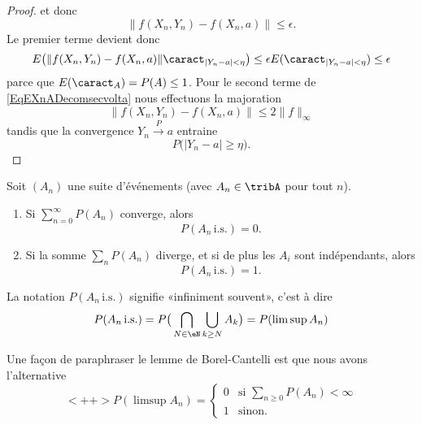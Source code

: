 \begin{proof}
    et donc
    \begin{equation}
        \| f(X_n,Y_n)-f(X_n,a) \|\leq \epsilon.
    \end{equation}
    Le premier terme devient donc
    \begin{equation}
        E\big( \| f(X_n,Y_n)-f(X_n,a) \|\caract_{| Y_n-a |<\eta} \big)\leq \epsilon E(\caract_{| Y_n-a |<\eta})\leq \epsilon
    \end{equation}
    parce que \( E(\caract_A)=P(A)\leq 1\). Pour le second terme de \eqref{EqEXnADecomsecvolta} nous effectuons la majoration
    \begin{equation}
        \| f(X_n,Y_n)-f(X_n,a) \|\leq 2\| f \|_{\infty}
    \end{equation}
    tandis que la convergence \( Y_n\stackrel{P}{\longrightarrow} a\) entraine 
    \begin{equation}
        P\big( | Y_n-a |\geq \eta \big).
    \end{equation}
\end{proof}

\begin{lemma}
    Soit \( (A_n)\) une suite d'événements (avec \( A_n\in\tribA\) pour tout \( n\)).
    \begin{enumerate}
        \item
            Si \( \sum_{n=0}^{\infty}P(A_n)\) converge, alors
            \begin{equation}
                P(A_n\,\text{i.s.})=0.
            \end{equation}
        \item
            Si la somme \( \sum_nP(A_n)\) diverge, et si de plus les \( A_i\) sont indépendants, alors
            \begin{equation}
                P(A_n\,\text{i.s.})=1.
            \end{equation}
    \end{enumerate}
\end{lemma}
La notation \( P(A_n\,\text{i.s.})\) signifie «infiniment souvent», c'est à dire
\begin{equation}
    P(A_n\,\text{i.s.})=P\big( \bigcap_{N\in\eN}\bigcup_{k\geq N}A_k \big)=P(\limsup A_n)
\end{equation}

Une façon de paraphraser le lemme de Borel-Cantelli est que nous avons l'alternative
\begin{equation}    \label{EqparaphrCantelli}<++>
    P(\limsup A_n)=\begin{cases}
        0    &   \text{si $\sum_{n\geq 0}P(A_n)<\infty$}\\
        1    &    \text{sinon}.
    \end{cases}
\end{equation}

